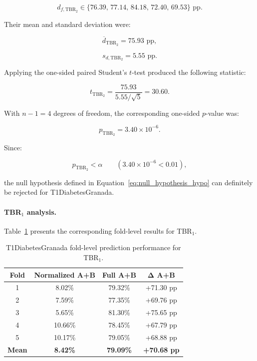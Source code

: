 \begin{equation}
d_{f,\mathrm{TBR_2}}
\in
\{
76.39,\,
77.14,\,
84.18,\,
72.40,\,
69.53
\}
\text{ pp}.
\end{equation}

Their mean and standard deviation were:

\begin{equation}
\overline{d}_{\mathrm{TBR_2}}
=
75.93
\text{ pp},
\end{equation}

\begin{equation}
s_{d,\mathrm{TBR_2}}
=
5.55
\text{ pp}.
\end{equation}

Applying the one-sided paired Student's \(t\)-test produced the following statistic:

\begin{equation}
t_{\mathrm{TBR_2}}
=
\frac{75.93}{5.55/\sqrt{5}}
=
30.60.
\end{equation}

With \(n-1=4\) degrees of freedom, the corresponding one-sided
\(p\)-value was:

\begin{equation}
p_{\mathrm{TBR_2}}
=
3.40 \times 10^{-6}.
\end{equation}

Since:

\begin{equation}
p_{\mathrm{TBR_2}} < \alpha
\qquad
(3.40 \times 10^{-6} < 0.01),
\end{equation}

the null hypothesis defined in Equation~\ref{eq:null_hypothesis_hypo} can definitely be rejected for T1DiabetesGranada.

\paragraph{TBR$_1$ analysis.}

Table~\ref{tab:t1diabetesgranada_fold_tbr1_effect} presents the corresponding fold-level results for TBR$_1$.

\begin{table}[htbp]
\centering
\caption{T1DiabetesGranada fold-level prediction performance for TBR$_1$.}
\label{tab:t1diabetesgranada_fold_tbr1_effect}
\begin{tabular}{cccc}
\toprule
\textbf{Fold}
& \textbf{Normalized A+B}
& \textbf{Full A+B}
& $\boldsymbol{\Delta}$ \textbf{A+B} \\
\midrule
1 & 8.02\% & 79.32\% & +71.30 pp \\
2 & 7.59\% & 77.35\% & +69.76 pp \\
3 & 5.65\% & 81.30\% & +75.65 pp \\
4 & 10.66\% & 78.45\% & +67.79 pp \\
5 & 10.17\% & 79.05\% & +68.88 pp \\
\midrule
\textbf{Mean}
& \textbf{8.42\%}
& \textbf{79.09\%}
& \textbf{+70.68 pp} \\
\bottomrule
\end{tabular}
\end{table}

